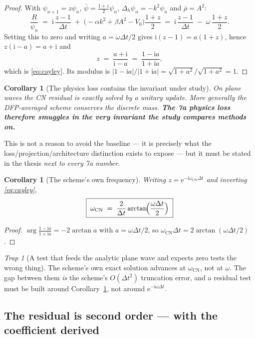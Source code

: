 \documentclass[11pt,a4paper]{article}
\theoremstyle{plain}
\newtheorem{corollary}[theorem]{Corollary}
\theoremstyle{definition}
\theoremstyle{remark}
\newtheorem{trap}[theorem]{Trap}
\newcommand{\iu}{\mathrm{i}}
\newcommand{\eu}{\mathrm{e}}
\newcommand{\lap}{\Delta}
\newcommand{\dt}{\Delta t}
\begin{document}
\begin{proof}
With $\psi_{n+1}=z\psi_n$, $\overline\psi = \tfrac{1+z}{2}\psi_n$, $\lap_h\psi_n = -k^2\psi_n$
and $\overline\rho = A^2$:
\[
\frac{R}{\psi_n} \;=\; \iu\,\frac{z-1}{\dt} \;+\; \bigl(-\alpha k^2 + \beta A^2 - V_0\bigr)\frac{1+z}{2}
\;=\; \iu\,\frac{z-1}{\dt} \;-\; \omega\,\frac{1+z}{2}.
\]
Setting this to zero and writing $a=\omega\dt/2$ gives $\iu(z-1) = a(1+z)$, hence
$z(\iu - a) = a+\iu$ and
\[
z \;=\; \frac{a+\iu}{\iu-a} \;=\; \frac{1-\iu a}{1+\iu a},
\]
which is \eqref{eq:cayley}. Its modulus is $|1-\iu a|/|1+\iu a| = \sqrt{1+a^2}/\sqrt{1+a^2}=1$.
\end{proof}

\begin{corollary}[The physics loss contains the invariant under study]
\label{cor:pinoconfound}
On plane waves the CN residual is exactly solved by a \emph{unitary} update. More
generally the DFP-averaged scheme conserves the discrete mass. \textbf{The 7a physics
loss therefore smuggles in the very invariant the study compares methods on.}
\end{corollary}

This is not a reason to avoid the baseline --- it is precisely what the
loss/projection/architecture distinction exists to expose --- but it must be stated in the
thesis \emph{next to every 7a number}.

\begin{corollary}[The scheme's own frequency]
\label{cor:cnfreq}
Writing $z = \eu^{-\iu\omega_{\mathrm{CN}}\dt}$ and inverting \eqref{eq:cayley},
\[
\boxed{\;\omega_{\mathrm{CN}} \;=\; \frac{2}{\dt}\arctan\!\Bigl(\frac{\omega\dt}{2}\Bigr)\;}
\]
\end{corollary}

\begin{proof}
$\arg\frac{1-\iu a}{1+\iu a} = -2\arctan a$ with $a=\omega\dt/2$, so
$\omega_{\mathrm{CN}}\dt = 2\arctan(\omega\dt/2)$.
\end{proof}

\begin{trap}[A test that feeds the analytic plane wave and expects zero tests the wrong
thing]
The scheme's own exact solution advances at $\omega_{\mathrm{CN}}$, not at $\omega$. The
gap between them \emph{is} the scheme's $O(\dt^2)$ truncation error, and a residual test
must be built around Corollary~\ref{cor:cnfreq}, not around $\eu^{-\iu\omega\dt}$.
\end{trap}

\subsection{The residual is second order --- with the coefficient derived}
\end{document}
